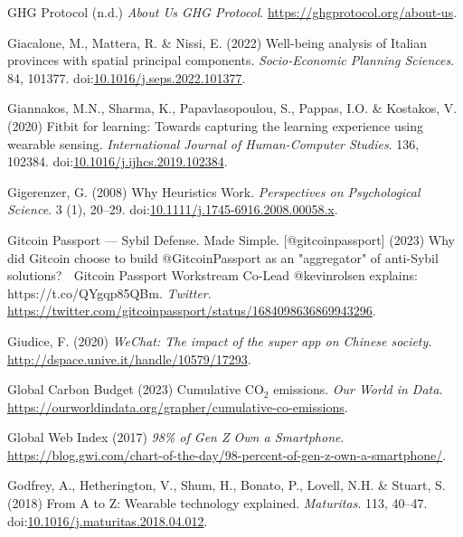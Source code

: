 \documentclass[
  letterpaper,
  DIV=11,
  numbers=noendperiod]{scrartcl}
\newlength{\cslhangindent}
\newenvironment{CSLReferences}[2] %
 {\begin{list}{}{%
  \setlength{\itemindent}{0pt}
  \setlength{\leftmargin}{0pt}
  \setlength{\parsep}{0pt}
  \ifodd #1
   \setlength{\leftmargin}{\cslhangindent}
   \setlength{\itemindent}{-1\cslhangindent}
  \fi
  \setlength{\itemsep}{#2\baselineskip}}}
 {\end{list}}
\begin{document}
\begin{CSLReferences}{0}{1}
GHG Protocol (n.d.) \emph{About {Us} {\textbar} {GHG Protocol}}.
\url{https://ghgprotocol.org/about-us}.

Giacalone, M., Mattera, R. \& Nissi, E. (2022) Well-being analysis of
{Italian} provinces with spatial principal components.
\emph{Socio-Economic Planning Sciences}. 84, 101377.
doi:\href{https://doi.org/10.1016/j.seps.2022.101377}{10.1016/j.seps.2022.101377}.

Giannakos, M.N., Sharma, K., Papavlasopoulou, S., Pappas, I.O. \&
Kostakos, V. (2020) Fitbit for learning: {Towards} capturing the
learning experience using wearable sensing. \emph{International Journal
of Human-Computer Studies}. 136, 102384.
doi:\href{https://doi.org/10.1016/j.ijhcs.2019.102384}{10.1016/j.ijhcs.2019.102384}.

Gigerenzer, G. (2008) Why {Heuristics Work}. \emph{Perspectives on
Psychological Science}. 3 (1), 20--29.
doi:\href{https://doi.org/10.1111/j.1745-6916.2008.00058.x}{10.1111/j.1745-6916.2008.00058.x}.

Gitcoin Passport --- Sybil Defense. Made Simple. {[}@gitcoinpassport{]}
(2023) Why did {Gitcoin} choose to build @{GitcoinPassport} as an
"aggregator" of anti-{Sybil} solutions? 🤔 {Gitcoin Passport Workstream
Co-Lead} @kevinrolsen explains: {https://t.co/QYgqp85QBm}.
\emph{Twitter}.
\url{https://twitter.com/gitcoinpassport/status/1684098636869943296}.

Giudice, F. (2020) \emph{{WeChat}: The impact of the super app on
{Chinese} society.} \url{http://dspace.unive.it/handle/10579/17293}.

Global Carbon Budget (2023) Cumulative {CO}{\(_2\)} emissions. \emph{Our
World in Data}.
\url{https://ourworldindata.org/grapher/cumulative-co-emissions}.

Global Web Index (2017) \emph{98\% of {Gen Z Own} a {Smartphone}}.
\url{https://blog.gwi.com/chart-of-the-day/98-percent-of-gen-z-own-a-smartphone/}.

Godfrey, A., Hetherington, V., Shum, H., Bonato, P., Lovell, N.H. \&
Stuart, S. (2018) From {A} to {Z}: {Wearable} technology explained.
\emph{Maturitas}. 113, 40--47.
doi:\href{https://doi.org/10.1016/j.maturitas.2018.04.012}{10.1016/j.maturitas.2018.04.012}.


\end{CSLReferences}
\end{document}
